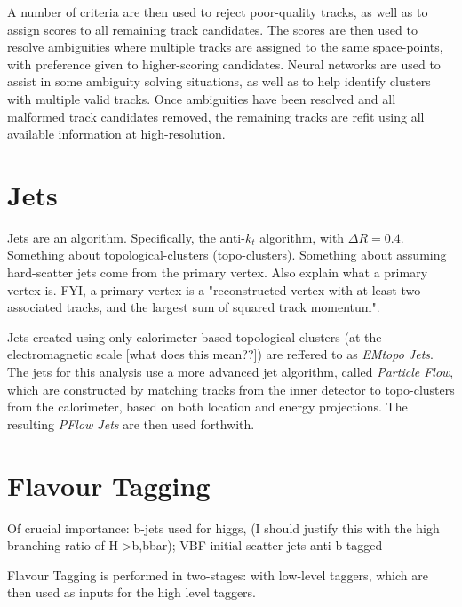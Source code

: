         A number of criteria are then used to reject poor-quality tracks, as well as to assign scores to all remaining track candidates.
        The scores are then used to resolve ambiguities where multiple tracks are assigned to the same space-points,
            with preference given to higher-scoring candidates.
        Neural networks are used to assist in some ambiguity solving situations,
            as well as to help identify clusters with multiple valid tracks.
        Once ambiguities have been resolved and all malformed track candidates removed,
            the remaining tracks are refit using all available information at high-resolution.
        \cite{atlas_track_reco_performance}

    \section{Jets}
        Jets are an algorithm.
        Specifically, the anti-$k_t$ algorithm, with $\Delta R = 0.4$.
        Something about topological-clusters (topo-clusters).
        \cite{anti_kt}
        Something about assuming hard-scatter jets come from the primary vertex.
        Also explain what a primary vertex is.
        FYI, a primary vertex is a "reconstructed vertex with at least two associated tracks, and the largest sum of squared track momentum".

        Jets created using only calorimeter-based topological-clusters (at the electromagnetic scale [what does this mean??]) %
            are reffered to as \textit{EMtopo Jets}.
        The jets for this analysis use a more advanced jet algorithm, called \textit{Particle Flow},
            which are constructed by matching tracks from the inner detector to topo-clusters from the calorimeter,
            based on both location and energy projections.
        The resulting \textit{PFlow Jets} are then used forthwith.
        \cite{pflow}
        \cite{jet_energy_scale13TeV}

    \section{Flavour Tagging}
        Of crucial importance:
            b-jets used for higgs, (I should justify this with the high branching ratio of H->b,bbar);
            VBF initial scatter jets anti-b-tagged

        Flavour Tagging is performed in two-stages:
            with low-level taggers,
            which are then used as inputs for the high level taggers.

